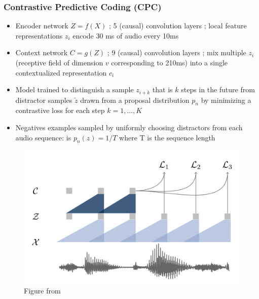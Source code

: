 \documentclass[table]{beamer}
\begin{document}
\begin{frame}
	\frametitle{Contrastive Predictive Coding (CPC)}
		\begin{itemize}
			\item Encoder network $Z=f(X)$ ; 5 (causal) convolution layers ; local feature representations $z_i$ encode 30 ms of audio every 10ms
			\item Context network $C=g(Z)$ ; 9 (causal) convolution layers ; mix multiple $z_i$ (receptive field of dimension $v$ corresponding to 210ms) into a single contextualized representation $c_i$
			\item Model trained to distinguish a sample $z_{i+k}$ that is $k$ steps in the future from distractor samples $\tilde{z}$ drawn from a proposal distribution $p_n$ by minimizing a contrastive loss for each step $k=1,...,K$
			\item Negatives examples sampled by uniformly choosing distractors from each audio sequence: is $p_n(z)=1/T$
where T is the sequence length
		\end{itemize} 

		\begin{figure}
			\centering
			\includegraphics[scale=0.15]	{unsupervisedspeech.png} 
			\caption{Figure from \citep{DBLP:journals/corr/abs-1904-05862}}
			\label{fig:unsup}
			\end{figure}

	
\end{frame}
\end{document}
